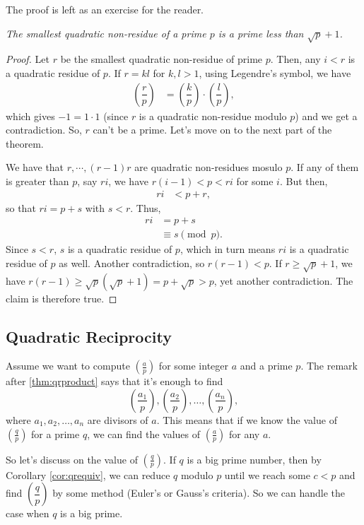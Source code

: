 \documentclass[main.tex]{subfile}
\begin{document}
The proof is left as an exercise for the reader.
		\begin{theorem}\slshape
			The smallest quadratic non-residue of a prime $p$ is a prime less than $\sqrt{p}+1$.
		\end{theorem}

		\begin{proof}
			Let $r$ be the smallest quadratic non-residue of prime $p$. Then, any $i<r$ is a quadratic residue of $p$. If $r=kl$ for $k,l>1$, using Legendre's symbol, we have
			\begin{align*}
				\left(\dfrac{r}{p}\right) & = \left(\dfrac{k}{p}\right)\cdot\left(\dfrac{l}{p}\right),
			\end{align*}
			which gives $-1=1\cdot 1$ (since $r$ is a quadratic non-residue modulo $p$) and we get a contradiction. So, $r$ can't be a prime. Let's move on to the next part of the theorem.

			We have that $r,\cdots,(r-1)r$ are quadratic non-residues mosulo $p$. If any of them is greater than $p$, say $ri$, we have $r(i-1)<p<ri$ for some $i$. But then,
			\begin{align*}
				ri & < p+r,
			\end{align*}
			so that $ri=p+s$ with $s<r$. Thus,
			\begin{align*}
				ri & = p+s\\
				& \equiv s\pmod p.
			\end{align*}
			Since $s<r$, $s$ is a quadratic residue of $p$, which in turn means $ri$ is a quadratic residue of $p$ as well. Another contradiction, so $r(r-1)<p$. If $r\geq\sqrt{p}+1$, we have $r(r-1)\geq\sqrt{p}(\sqrt{p}+1)=p+\sqrt{p}>p$, yet another contradiction. The claim is therefore true.
		\end{proof}

	\subsection{Quadratic Reciprocity}
	Assume we want to compute $ \left(\frac{a}{p}\right)$ for some integer $a$ and a prime $p$. The remark after \autoref{thm:qrproduct} says that it's enough to find $$ \left(\dfrac{a_1}{p}\right), \left(\dfrac{a_2}{p}\right), \ldots, \left(\dfrac{a_n}{p}\right),$$ where $a_1,a_2,\ldots,a_n$ are divisors of $a$. This means that if we know the value of $\left(\frac{q}{p}\right)$ for a prime $q$, we can find the values of $\left(\frac{a}{p}\right)$ for any $a$.

	So let's discuss on the value of $\left(\frac{q}{p}\right)$. If $q$ is a big prime number, then by Corollary \ref{cor:qrequiv}, we can reduce $q$ modulo $p$ until we reach some $c<p$ and find $\left(\dfrac{q}{p}\right)$ by some method (Euler's or Gauss's criteria). So we can handle the case when $q$ is a big prime.
\end{document}
